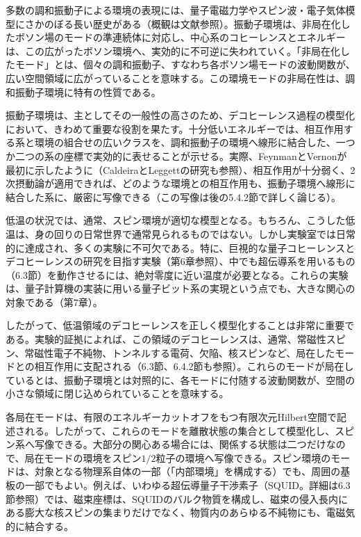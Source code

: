 \hypertarget{srcpage:175}{}\label{srcpage:175}
多数の調和振動子による環境の表現には、量子電磁力学やスピン波・電子気体模型にさかのぼる長い歴史がある（概観は文献\cite{ref210}参照）。振動子環境は、非局在化したボソン場のモードの準連続体に対応し、中心系のコヒーレンスとエネルギーは、この広がったボソン環境へ、実効的に不可逆に失われていく。「非局在化したモード」とは、個々の調和振動子、すなわち各ボソン場モードの波動関数が、広い空間領域に広がっていることを意味する。この環境モードの非局在性は、調和振動子環境に特有の性質である。

振動子環境は、主としてその一般性の高さのため、デコヒーレンス過程の模型化において、きわめて重要な役割を果たす。十分低いエネルギーでは、相互作用する系と環境の組合せの広いクラスを、調和振動子の環境へ線形に結合した、一つか二つの系の座標で実効的に表せることが示せる。実際、FeynmanとVernon\cite{ref211}が最初に示したように（CaldeiraとLeggettの研究\cite{ref212}も参照）、相互作用が十分弱く、2次摂動論が適用できれば、どのような環境との相互作用も、振動子環境へ線形に結合した系に、厳密に写像できる（この写像は後の5.4.2節で詳しく論じる）。

低温の状況では、通常、スピン環境が適切な模型となる。もちろん、こうした低温は、身の回りの日常世界で通常見られるものではない。しかし実験室では日常的に達成され、多くの実験に不可欠である。特に、巨視的な量子コヒーレンスとデコヒーレンスの研究を目指す実験（第6章参照）、中でも超伝導系を用いるもの（6.3節）を動作させるには、絶対零度に近い温度が必要となる。これらの実験は、量子計算機の実装に用いる量子ビット系の実現という点でも、大きな関心の対象である（第7章）。

したがって、低温領域のデコヒーレンスを正しく模型化することは非常に重要である。実験的証拠によれば、この領域のデコヒーレンスは、通常、常磁性スピン、常磁性電子不純物、トンネルする電荷、欠陥、核スピンなど、局在したモードとの相互作用に支配される\cite{ref199,ref200,ref213}（6.3節、6.4.2節も参照）。これらのモードが局在しているとは、振動子環境とは対照的に、各モードに付随する波動関数が、空間の小さな領域に閉じ込められていることを意味する。

\hypertarget{srcpage:176}{}\label{srcpage:176}
各局在モードは、有限のエネルギーカットオフをもつ有限次元Hilbert空間で記述される。したがって、これらのモードを離散状態の集合として模型化し、スピン系へ写像できる。大部分の関心ある場合には、関係する状態は二つだけなので、局在モードの環境をスピン$1/2$粒子の環境へ写像できる。スピン環境のモードは、対象となる物理系自体の一部（「内部環境」を構成する）でも、周囲の基板の一部でもよい。例えば、いわゆる超伝導量子干渉素子（SQUID。詳細は6.3節参照）では、磁束座標は、SQUIDのバルク物質を構成し、磁束の侵入長内にある膨大な核スピンの集まりだけでなく、物質内のあらゆる不純物にも、電磁気的に結合する\cite{ref214}。

